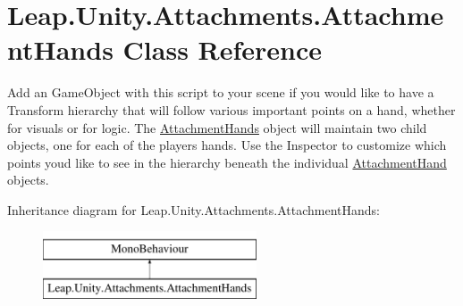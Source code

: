 \hypertarget{class_leap_1_1_unity_1_1_attachments_1_1_attachment_hands}{}\section{Leap.\+Unity.\+Attachments.\+Attachment\+Hands Class Reference}
\label{class_leap_1_1_unity_1_1_attachments_1_1_attachment_hands}


Add an Game\+Object with this script to your scene if you would like to have a Transform hierarchy that will follow various important points on a hand, whether for visuals or for logic. The \mbox{\hyperlink{class_leap_1_1_unity_1_1_attachments_1_1_attachment_hands}{Attachment\+Hands}} object will maintain two child objects, one for each of the player\textquotesingle{}s hands. Use the Inspector to customize which points you\textquotesingle{}d like to see in the hierarchy beneath the individual \mbox{\hyperlink{class_leap_1_1_unity_1_1_attachments_1_1_attachment_hand}{Attachment\+Hand}} objects.  


Inheritance diagram for Leap.\+Unity.\+Attachments.\+Attachment\+Hands\+:\begin{figure}[H]
\begin{center}
\leavevmode
\includegraphics[height=2.000000cm]{class_leap_1_1_unity_1_1_attachments_1_1_attachment_hands}
\end{center}
\end{figure}
